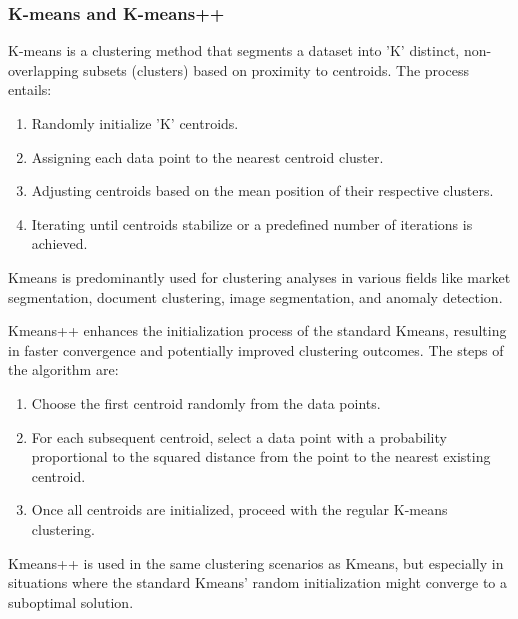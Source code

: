 \subsubsection{K-means and K-means++}
K-means is a clustering method that segments a dataset into 'K' distinct, non-overlapping subsets (clusters) based on proximity to centroids\cite{ML_paper}.
The process entails:
\begin{enumerate}
    \item Randomly initialize 'K' centroids.
    \item Assigning each data point to the nearest centroid cluster.
    \item Adjusting centroids based on the mean position of their respective clusters.
    \item Iterating until centroids stabilize or a predefined number of iterations is achieved.
\end{enumerate}

Kmeans is predominantly used for clustering analyses in various fields like market segmentation, document clustering, image segmentation, and anomaly detection.

Kmeans++ enhances the initialization process of the standard Kmeans, resulting in faster convergence and potentially improved clustering outcomes\cite{kmeans++}.
The steps of the algorithm are:
\begin{enumerate}
    \item Choose the first centroid randomly from the data points.
    \item For each subsequent centroid, select a data point with a probability proportional to the squared distance from the point to the nearest existing centroid.
    \item Once all centroids are initialized, proceed with the regular K-means clustering.
\end{enumerate}

Kmeans++ is used in the same clustering scenarios as Kmeans, but especially in situations where the standard Kmeans' random initialization might converge to a suboptimal solution.

